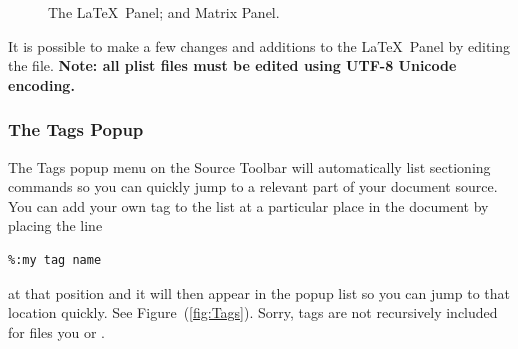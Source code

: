 \documentclass[letterpaper,11pt]{article}
\newcommand{\cmd}[1]{\textsf{#1}}
\newcommand{\mnu}[1]{\textsf{#1}}
\begin{document}
\begin{figure}
\centering
{}%
\qquad%
%
\caption[LaTeX and Matrix Panels.]{
 The \LaTeX\ Panel; and
 Matrix Panel.}
\label{fig:LandMPanels}
\end{figure}

It is possible to make a few changes and additions to the \LaTeX\ Panel by editing the 
 file. \textbf{Note: all \cmd{plist} files must be edited using UTF-8 Unicode encoding.}

\subsubsection{The Tags Popup}

The \mnu{Tags} popup menu on the Source Toolbar will automatically list sectioning commands so you can quickly jump to a relevant part of your document source. You can add your own tag to the list at a particular place in the document by placing the line
\begin{verbatim}
%:my tag name
\end{verbatim}
at that position and it will then appear in the popup list so you can jump to that location quickly. See Figure~(\ref{fig:Tags}). Sorry, tags are not recursively included for files you \verb|| or \verb||.
\end{document}
